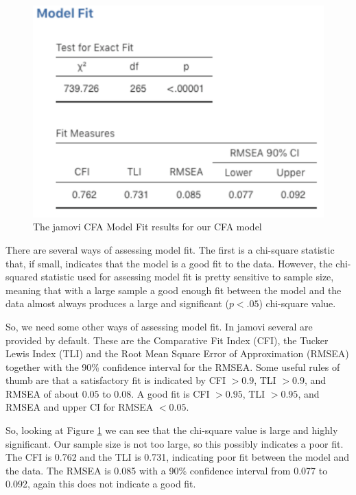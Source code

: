 \documentclass[
]{book}
\begin{document}
\begin{figure}

{\centering \includegraphics[width=1\linewidth]{img/factoranalysis/cfa3} 

}

\caption{The jamovi CFA Model Fit results for our CFA model}\label{fig:cfa3}
\end{figure}

There are several ways of assessing model fit. The first is a chi-square statistic that, if small, indicates that the model is a good fit to the data. However, the chi-squared statistic used for assessing model fit is pretty sensitive to sample size, meaning that with a large sample a good enough fit between the model and the data almost always produces a large and significant (\(p<.05\)) chi-square value.

So, we need some other ways of assessing model fit. In jamovi several are provided by default. These are the Comparative Fit Index (CFI), the Tucker Lewis Index (TLI) and the Root Mean Square Error of Approximation (RMSEA) together with the 90\% confidence interval for the RMSEA. Some useful rules of thumb are that a satisfactory fit is indicated by CFI \(>0.9\), TLI \(>0.9\), and RMSEA of about \(0.05\) to \(0.08\). A good fit is CFI \(>0.95\), TLI \(>0.95\), and RMSEA and upper CI for RMSEA \(<0.05\).

So, looking at Figure \ref{fig:cfa3} we can see that the chi-square value is large and highly significant. Our sample size is not too large, so this possibly indicates a poor fit. The CFI is 0.762 and the TLI is 0.731, indicating poor fit between the model and the data. The RMSEA is 0.085 with a 90\% confidence interval from 0.077 to 0.092, again this does not indicate a good fit.
\end{document}

